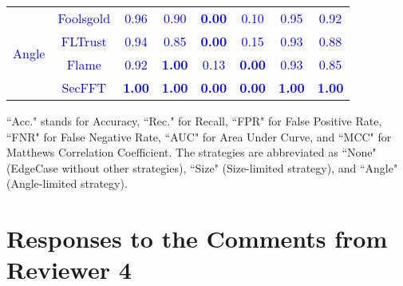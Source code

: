 \documentclass[a4paper,twoside,11pt,dvipsnames]{reviewresponse}
\begin{document}
\begin{table}[h!]
{\begin{tabular}{c|c|c|c|c|c|c|c}
\multirow{4}{*}{\textcolor{blue}{Angle}} & \textcolor{blue}{Foolsgold} & \textcolor{blue}{0.96} & \textcolor{blue}{0.90} & \textbf{\textcolor{blue}{0.00}} & \textcolor{blue}{0.10} & \textcolor{blue}{0.95} & \textcolor{blue}{0.92} \\ 
                        & \textcolor{blue}{FLTrust}   & \textcolor{blue}{0.94} & \textcolor{blue}{0.85} & \textbf{\textcolor{blue}{0.00}} & \textcolor{blue}{0.15} & \textcolor{blue}{0.93} & \textcolor{blue}{0.88} \\ 
                        & \textcolor{blue}{Flame}     & \textcolor{blue}{0.92} & \textbf{\textcolor{blue}{1.00}} & \textcolor{blue}{0.13} & \textbf{\textcolor{blue}{0.00}} & \textcolor{blue}{0.93} & \textcolor{blue}{0.85} \\ 
                        & \textcolor{blue}{SecFFT}    & \textbf{\textcolor{blue}{1.00}} & \textbf{\textcolor{blue}{1.00}} & \textbf{\textcolor{blue}{0.00}} & \textbf{\textcolor{blue}{0.00}} & \textbf{\textcolor{blue}{1.00}} & \textbf{\textcolor{blue}{1.00}} \\ \hline

\end{tabular}
}
\vspace{1em}
\begin{tablenotes}
\scriptsize
\item ``Acc." stands for Accuracy, ``Rec." for Recall, ``FPR" for False Positive Rate, ``FNR" for False Negative Rate, ``AUC" for Area Under Curve, and ``MCC" for Matthews Correlation Coefficient. The strategies are abbreviated as ``None" (EdgeCase without other strategies), ``Size" (Size-limited strategy), and ``Angle" (Angle-limited strategy).
\end{tablenotes}
\label{tab:detect}
\end{table}

\newpage

\section{Responses to the Comments from Reviewer 4}
\end{document}

